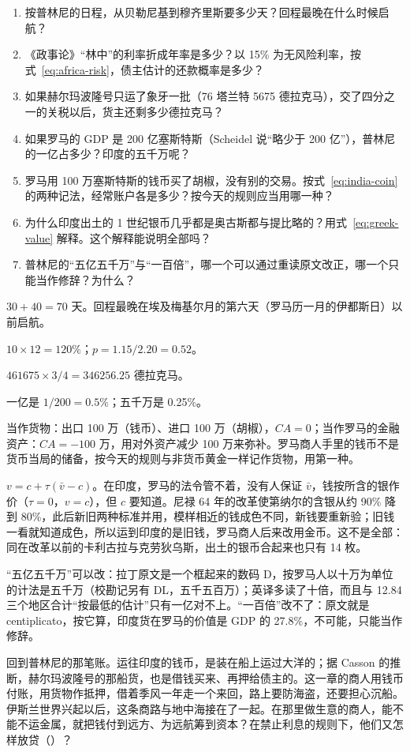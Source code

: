 \begin{selfcheck}
\begin{enumerate}
\item 按普林尼的日程，从贝勒尼基到穆齐里斯要多少天？回程最晚在什么时候启航？
\item 《政事论》“林中”的利率折成年率是多少？以 15\% 为无风险利率，按式~\eqref{eq:africa-risk}，债主估计的还款概率是多少？
\item 如果赫尔玛波隆号只运了象牙一批（76 塔兰特 5675 德拉克马），交了四分之一的关税以后，货主还剩多少德拉克马？
\item 如果罗马的 GDP 是 200 亿塞斯特斯（Scheidel 说“略少于 200 亿”），普林尼的一亿占多少？印度的五千万呢？
\item 罗马用 100 万塞斯特斯的钱币买了胡椒，没有别的交易。按式~\eqref{eq:india-coin} 的两种记法，经常账户各是多少？按今天的规则应当用哪一种？
\item 为什么印度出土的 1 世纪银币几乎都是奥古斯都与提比略的？用式~\eqref{eq:greek-value} 解释。这个解释能说明全部吗？
\item 普林尼的“五亿五千万”与“一百倍”，哪一个可以通过重读原文改正，哪一个只能当作修辞？为什么？
\end{enumerate}
\end{selfcheck}

\begin{answers}
\item $30+40=70$ 天。回程最晚在埃及梅基尔月的第六天（罗马历一月的伊都斯日）以前启航。
\item $10\times12=120\%$；$p=1.15/2.20=0.52$。
\item $461675\times3/4=346256.25$ 德拉克马。
\item 一亿是 $1/200=0.5\%$；五千万是 0.25\%。
\item 当作货物：出口 100 万（钱币）、进口 100 万（胡椒），$\mathit{CA}=0$；当作罗马的金融资产：$\mathit{CA}=-100$ 万，用对外资产减少 100 万来弥补。罗马商人手里的钱币不是货币当局的储备，按今天的规则与非货币黄金一样记作货物，用第一种。
\item $v=c+\tau(\bar v-c)$。在印度，罗马的法令管不着，没有人保证 $\bar v$，钱按所含的银作价（$\tau=0$，$v=c$），但 $c$ 要知道。尼禄 64 年的改革使第纳尔的含银从约 90\% 降到 80\%，此后新旧两种标准并用，模样相近的钱成色不同，新钱要重新验；旧钱一看就知道成色，所以运到印度的是旧钱，罗马商人后来改用金币。这不是全部：同在改革以前的卡利古拉与克劳狄乌斯，出土的银币合起来也只有 14 枚。
\item “五亿五千万”可以改：拉丁原文是一个框起来的数码 D，按罗马人以十万为单位的计法是五千万（校勘记另有 DL，五千五百万）；英译多读了十倍，而且与 12.84 三个地区合计“按最低的估计”只有一亿对不上。“一百倍”改不了：原文就是 centiplicato，按它算，印度货在罗马的价值是 GDP 的 27.8\%，不可能，只能当作修辞。
\end{answers}

回到普林尼的那笔账。运往印度的钱币，是装在船上运过大洋的；据 Casson 的推断，赫尔玛波隆号的那船货，也是借钱买来、再押给债主的。这一章的商人用钱币付账，用货物作抵押，借着季风一年走一个来回，路上要防海盗，还要担心沉船。伊斯兰世界兴起以后，这条商路与地中海接在了一起。在那里做生意的商人，能不能不运金属，就把钱付到远方、为远航筹到资本？在禁止利息的规则下，他们又怎样放贷（）？
